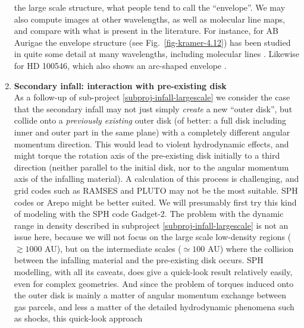 \documentclass[10pt,fleqn,twoside]{article}
\begin{document}
\begin{enumerate}
  the large scale structure, what people tend to call the ``envelope''.  We
  may also compute images at other wavelengths, as well as molecular line
  maps, and compare with what is present in the literature. For instance,
  for AB Aurigae the envelope structure (see Fig.~\ref{fig-kramer-4.12}) has
  been studied in quite some detail at many wavelengths, including molecular
  lines \citep{2005ApJ...621..853S}. Likewise for HD 100546, which also 
  shows an arc-shaped envelope \citep{2007ApJ...665..512A}.
\item {\bf Secondary infall: interaction with pre-existing disk}\label{subproj-infall-interact}\\
  As a follow-up of sub-project \ref{subproj-infall-largescale} we consider
  the case that the secondary infall may not just simply {\em create} a new
  ``outer disk'', but collide onto a {\em previously existing} outer disk
  (of better: a full disk including inner and outer part in the same plane) 
  with a completely different angular momentum direction. This would lead to
  violent hydrodynamic effects, and might torque the rotation axis of the
  pre-existing disk initially to a third direction (neither parallel to the
  initial disk, nor to the angular momentum axis of the infalling
  material). A calculation of this process is challenging, and grid codes
  such as RAMSES and PLUTO may not be the most suitable. SPH codes or Arepo
  might be better suited. We will presumably first try this kind of modeling
  with the SPH code Gadget-2. The problem with the dynamic range in density
  described in subproject \ref{subproj-infall-largescale} is not an issue
  here, because we will not focus on the large scale low-density regions
  ($\gtrsim 1000$ AU), but on the intermediate scales ($\simeq 100$ AU)
  where the collision between the infalling material and the pre-existing
  disk occurs. SPH modelling, with all its caveats, does give a quick-look
  result relatively easily, even for complex geometries. And since the
  problem of torques induced onto the outer disk is mainly a matter of
  angular momentum exchange between gas parcels, and less a matter of the
  detailed hydrodynamic phenomena such as shocks, this quick-look approach

\end{enumerate}
\end{document}
